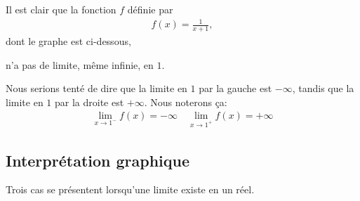 \documentclass[main.tex]{subfiles}
\begin{document}
\begin{example}

    Il est clair que la fonction $f$ définie par
    \begin{align}
        f(x) = \frac 1 {x + 1},
    \end{align}
    dont le graphe est ci-dessous,
    \begin{center}
        \begin{plot}{0.5}{-6}{-6}{6}{6}
        \end{plot}
    \end{center}
    n'a pas de limite, même infinie, en $1$.

    Nous serions tenté de dire que la limite en $1$ par la gauche est $-\infty$,
    tandis que la limite en $1$ par la droite est $+\infty$.
    Nous noterons ça:
    \begin{align}
        \lim_{x \to 1^-} f(x) = -\infty
        \quad
        \lim_{x \to 1^+} f(x) = +\infty
    \end{align}
\end{example}

\subsection{Interprétation graphique}

Trois cas se présentent lorsqu'une limite existe en un réel.
\end{document}

